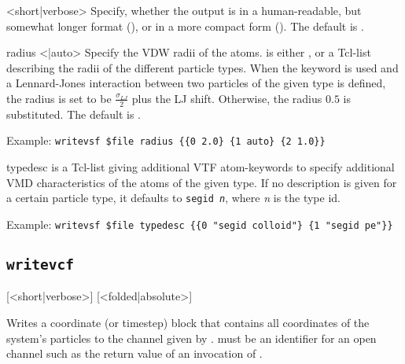 \begin{arguments}
\item[<short|verbose>]
  Specify, whether the output is in a human-readable, but somewhat
  longer format (), or in a more compact form
  (). The default is .
  
\item[radius <\var{radii}|auto>]
  Specify the VDW radii of the atoms.  is either
  , or a Tcl-list describing the radii of the different
  particle types. When the keyword  is used and a
  Lennard-Jones interaction between two particles of the given type is
  defined, the radius is set to be $\frac{\sigma_{LJ}}{2}$ plus the LJ
  shift.  Otherwise, the radius $0.5$ is substituted. The default is
  .
  
  Example: \verb!writevsf $file radius {{0 2.0} {1 auto} {2 1.0}}!
  
\item[typedesc \var{typedesc}]
   is a Tcl-list giving additional VTF atom-keywords to
  specify additional VMD characteristics of the atoms of the given type.
  If no description is given for a certain particle type, it defaults to
  \texttt{segid \textit{n}}, where \textit{n} is the type id.
  
  Example: \verb!writevsf $file typedesc {{0 "segid colloid"} {1 "segid pe"}}!
\end{arguments}


\subsection{\texttt{writevcf}}
{ [<short|verbose>] [<folded|absolute>]}

Writes a coordinate (or timestep) block that contains all coordinates
of the system's particles to the channel given by .
 must be an identifier for an open channel such as the
return value of an invocation of .

